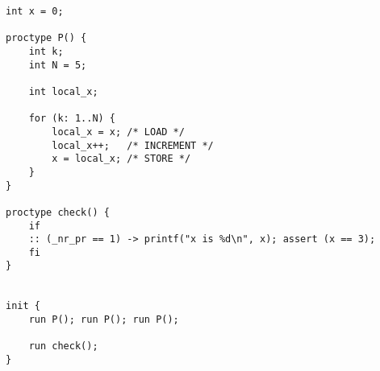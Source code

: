 \begin{lstlisting}[language=Promela]
int x = 0;

proctype P() {
    int k;
    int N = 5;

    int local_x;

    for (k: 1..N) {
        local_x = x; /* LOAD */ 
        local_x++;   /* INCREMENT */ 
        x = local_x; /* STORE */ 
    }
}

proctype check() {
    if 
    :: (_nr_pr == 1) -> printf("x is %d\n", x); assert (x == 3);
    fi
}


init { 
	run P(); run P(); run P(); 

    run check();
} 
\end{lstlisting}
